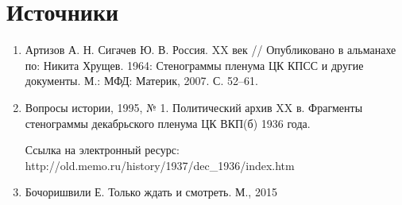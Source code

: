 
    \section*{Источники}
      \begin{enumerate}
        \item Артизов А. Н. Сигачев Ю. В. Россия. XX век // Опубликовано в альманахе по: Никита Хрущев. 1964: Стенограммы пленума ЦК КПСС и другие документы. М.: МФД: Материк, 2007. С. 52–61.
        \item Вопросы истории, 1995, № 1. Политический архив XX в. Фрагменты стенограммы декабрьского пленума ЦК ВКП(б) 1936 года.\par Ссылка на электронный ресурс: http://old.memo.ru/history/1937/dec\_1936/index.htm
        \item Бочоришвили Е. Только ждать и смотреть. М., 2015
      \end{enumerate}
      
